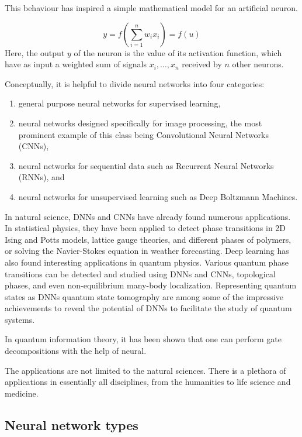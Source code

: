 \documentclass[%
oneside,                 %
final,                   %
10pt]{article}
\begin{document}
This behaviour has inspired a simple mathematical model for an artificial neuron.

\begin{equation}
 y = f\left(\sum_{i=1}^n w_ix_i\right) = f(u)
 \label{artificialNeuron}
\end{equation}
Here, the output $y$ of the neuron is the value of its activation function, which have as input
a weighted sum of signals $x_i, \dots ,x_n$ received by $n$ other neurons.

Conceptually, it is helpful to divide neural networks into four
categories:
\begin{enumerate}
\item general purpose neural networks for supervised learning,

\item neural networks designed specifically for image processing, the most prominent example of this class being Convolutional Neural Networks (CNNs),

\item neural networks for sequential data such as Recurrent Neural Networks (RNNs), and

\item neural networks for unsupervised learning such as Deep Boltzmann Machines.
\end{enumerate}

\noindent
In natural science, DNNs and CNNs have already found numerous
applications. In statistical physics, they have been applied to detect
phase transitions in 2D Ising and Potts models, lattice gauge
theories, and different phases of polymers, or solving the
Navier-Stokes equation in weather forecasting.  Deep learning has also
found interesting applications in quantum physics. Various quantum
phase transitions can be detected and studied using DNNs and CNNs,
topological phases, and even non-equilibrium many-body
localization. Representing quantum states as DNNs quantum state
tomography are among some of the impressive achievements to reveal the
potential of DNNs to facilitate the study of quantum systems.

In quantum information theory, it has been shown that one can perform
gate decompositions with the help of neural. 

The applications are not limited to the natural sciences. There is a
plethora of applications in essentially all disciplines, from the
humanities to life science and medicine.

\subsection{Neural network types}
\end{document}
